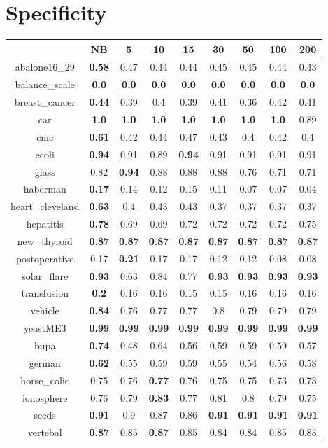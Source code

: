 \documentclass{article}%
\begin{document}
%
\section*{Specificity}%
\begin{tabular}{c|cccccccc}%
\hline%
&NB&5&10&15&30&50&100&200\\%
\hline%
abalone16\_29&\textbf{0.58}&0.47&0.44&0.44&0.45&0.45&0.44&0.43\\%
\hline%
balance\_scale&\textbf{0.0}&\textbf{0.0}&\textbf{0.0}&\textbf{0.0}&\textbf{0.0}&\textbf{0.0}&\textbf{0.0}&\textbf{0.0}\\%
\hline%
breast\_cancer&\textbf{0.44}&0.39&0.4&0.39&0.41&0.36&0.42&0.41\\%
\hline%
car&\textbf{1.0}&\textbf{1.0}&\textbf{1.0}&\textbf{1.0}&\textbf{1.0}&\textbf{1.0}&\textbf{1.0}&0.89\\%
\hline%
cmc&\textbf{0.61}&0.42&0.44&0.47&0.43&0.4&0.42&0.4\\%
\hline%
ecoli&\textbf{0.94}&0.91&0.89&\textbf{0.94}&0.91&0.91&0.91&0.91\\%
\hline%
glass&0.82&\textbf{0.94}&0.88&0.88&0.88&0.76&0.71&0.71\\%
\hline%
haberman&\textbf{0.17}&0.14&0.12&0.15&0.11&0.07&0.07&0.04\\%
\hline%
heart\_cleveland&\textbf{0.63}&0.4&0.43&0.43&0.37&0.37&0.37&0.37\\%
\hline%
hepatitis&\textbf{0.78}&0.69&0.69&0.72&0.72&0.72&0.72&0.75\\%
\hline%
new\_thyroid&\textbf{0.87}&\textbf{0.87}&\textbf{0.87}&\textbf{0.87}&\textbf{0.87}&\textbf{0.87}&\textbf{0.87}&\textbf{0.87}\\%
\hline%
postoperative&0.17&\textbf{0.21}&0.17&0.17&0.12&0.12&0.08&0.08\\%
\hline%
solar\_flare&\textbf{0.93}&0.63&0.84&0.77&\textbf{0.93}&\textbf{0.93}&\textbf{0.93}&\textbf{0.93}\\%
\hline%
transfusion&\textbf{0.2}&0.16&0.16&0.15&0.15&0.16&0.16&0.16\\%
\hline%
vehicle&\textbf{0.84}&0.76&0.77&0.77&0.8&0.79&0.79&0.79\\%
\hline%
yeastME3&\textbf{0.99}&\textbf{0.99}&\textbf{0.99}&\textbf{0.99}&\textbf{0.99}&\textbf{0.99}&\textbf{0.99}&\textbf{0.99}\\%
\hline%
bupa&\textbf{0.74}&0.48&0.64&0.56&0.59&0.59&0.59&0.57\\%
\hline%
german&\textbf{0.62}&0.55&0.59&0.59&0.55&0.54&0.56&0.58\\%
\hline%
horse\_colic&0.75&0.76&\textbf{0.77}&0.76&0.75&0.75&0.73&0.73\\%
\hline%
ionosphere&0.76&0.79&\textbf{0.83}&0.77&0.81&0.8&0.79&0.75\\%
\hline%
seeds&\textbf{0.91}&0.9&0.87&0.86&\textbf{0.91}&\textbf{0.91}&\textbf{0.91}&\textbf{0.91}\\%
\hline%
vertebal&\textbf{0.87}&0.85&\textbf{0.87}&0.85&0.84&0.84&0.85&0.83\\%
\hline%
\end{tabular}
\end{document}
